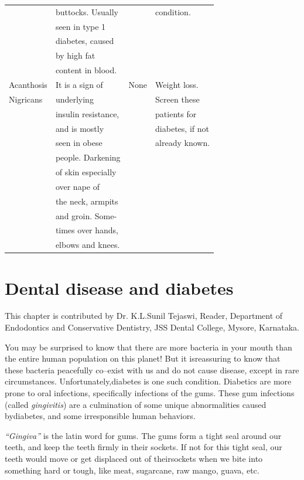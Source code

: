 {\begin{longtable}{|l|l|l|l|}
 & buttocks. Usually &  & condition.\\
 & seen in type 1 &  & \\
 & diabetes, caused &  & \\
 & by high fat &  & \\
 & content in blood. &  & \\
\hline
Acanthosis & It is a sign of & None & Weight loss.\\
Nigricans & underlying &  & Screen these\\
 & insulin resistance, &  & patients for\\
 & and is mostly &  & diabetes, if not\\
 & seen in obese &  & already known.\\
 & people. Darkening &  & \\
 & of skin especially &  & \\
 & over nape of &  & \\
 & the neck, armpits &  & \\
 & and groin. Some- &  & \\
 & times over hands, &  & \\
 & elbows and knees. &  & \\
\hline
\end{longtable}
}\relax


\newpage
 
\setcounter{chapter}{17}
\renewcommand{\thechapter}{\arabic{chapter}B}
\chapter{Dental disease and diabetes}\label{chap18B}

This chapter is contributed by Dr. K.L.Sunil Tejaswi, Reader, Department of Endodontics and Conservative Dentistry, JSS Dental College, Mysore, Karnataka.

You may be surprised to know that there are more bacteria in your mouth than the entire human population on this planet! But it is\break reassuring to know that these bacteria peacefully co–exist with us and do not cause disease, except in rare circumstances. Unfortunately,\break diabetes is one such condition. Diabetics are more prone to oral infe\-ctions, specifically infections of the gums. These gum infections (called \textit{gingivitis}) are a culmination of some unique abnormalities caused by\break diabetes, and some irresponsible human behaviors.

\textit{“Gingiva”} is the latin word for gums. The gums form a tight seal around our teeth, and keep the teeth firmly in their sockets. If not for this tight seal, our teeth would move or get displaced out of their\break sockets when we bite into something hard or tough, like meat, sugarcane, raw mango, guava, etc.

